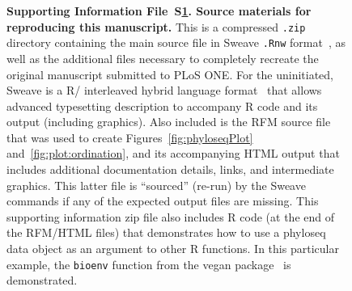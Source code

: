 \documentclass[10pt]{article}\usepackage{graphicx, color}
\newcommand{\R}{{\textsf{R}}}
\newcommand{\code}[1]{{\texttt{#1}}}
\begin{document}
\begin{figure}[!ht]
\begin{center}
\end{center}
\caption{
{\bf Supporting Information File~S\ref{supp:sweave:source}.
Source materials for reproducing this manuscript.}
This is a compressed \code{.zip} directory
containing the main source file in Sweave \code{.Rnw} format~\cite{Sweave},
as well as the additional files necessary 
to completely recreate the original manuscript
submitted to PLoS ONE.
For the uninitiated, Sweave is a \R{}/\LaTeXe
interleaved hybrid language format~\cite{Sweave}
that allows advanced typesetting description
to accompany \R{} code and its output (including graphics).
Also included is the RFM source file
that was used to create
Figures~\ref{fig:phyloseqPlot} and~\ref{fig:plot:ordination},
and its accompanying HTML output
that includes additional documentation details, links,
and intermediate graphics.
This latter file is ``sourced'' (re-run) by the Sweave commands
if any of the expected output files are missing.
This supporting information zip file also includes
\R{} code (at the end of the RFM/HTML files) that demonstrates
how to use a phyloseq data object
as an argument to other \R{} functions.
In this particular example,
the \code{bioenv} function
from the vegan package~\cite{veganpkg}
is demonstrated.
}
\label{supp:sweave:source}
\end{figure}
\end{document}
